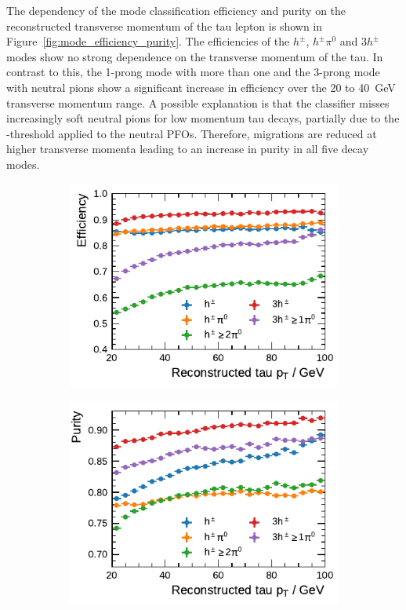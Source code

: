 The dependency of the mode classification efficiency and purity on the
reconstructed transverse momentum of the tau lepton is shown in
Figure~\ref{fig:mode_efficiency_purity}. The efficiencies of the $h^\pm$,
$h^\pm \pi^0$ and $3h^\pm$ modes show no strong dependence on the transverse
momentum of the tau. In contrast to this, the 1-prong mode with more than one
and the 3-prong mode with neutral pions show a significant increase in
efficiency over the \num{20} to \SI{40}{\GeV} transverse momentum range. A
possible explanation is that the classifier misses increasingly soft neutral
pions for low momentum tau decays, partially due to the \pt-threshold applied to
the neutral PFOs. Therefore, migrations are reduced at higher transverse momenta
leading to an increase in purity in all five decay modes.

\begin{figure}[htb]
  \begin{subfigure}{0.48\textwidth}
    \centering
    \includegraphics{./figures/decay_mode_classification/combined_sub_e_moments_shots_conv_ptcut_1_5/efficiency_profile.pdf}
  \end{subfigure}\hfill
  \begin{subfigure}{0.48\textwidth}
    \centering
    \includegraphics{./figures/decay_mode_classification/combined_sub_e_moments_shots_conv_ptcut_1_5/purity_profile.pdf}

\end{subfigure}
\end{figure}

